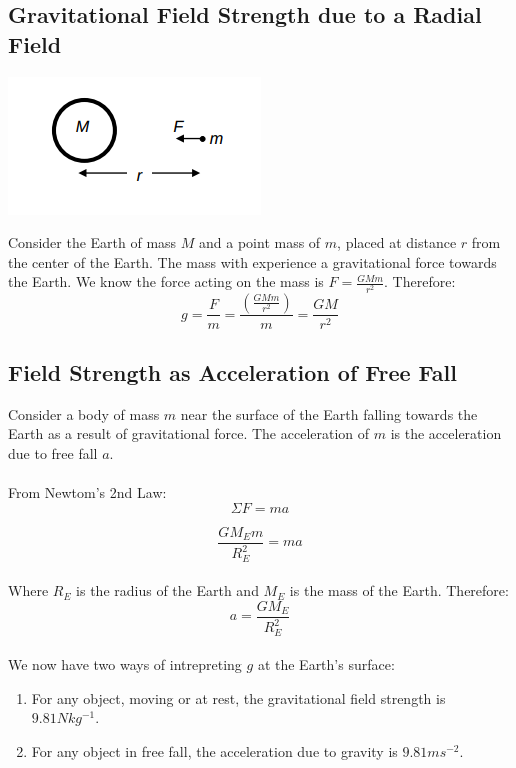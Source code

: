 \documentclass{article}
\begin{document}
\subsection{Gravitational Field Strength due to a Radial Field}
\begin{center}
    \includegraphics[scale=0.6]{assets/radialFieldGrav.png}
\end{center}\leavevmode Consider the Earth of mass $M$ and a point mass of $m$, placed at distance $r$ from the center of the Earth. The mass with experience a gravitational force towards the Earth.
We know the force acting on the mass is $F=\frac{GMm}{r^2}$. Therefore:
\\\begin{equation}
    g=\frac{F}{m}=\frac{(\frac{GMm}{r^2})}{m}=\frac{GM}{r^2}
\end{equation}

\subsection{Field Strength as Acceleration of Free Fall}
Consider a body of mass $m$ near the surface of the Earth falling towards the Earth as a result of gravitational force. The acceleration of $m$ is the acceleration due to free fall $a$.
\\
\\From Newtom's 2nd Law:
\begin{equation}
    \Sigma F=ma
\end{equation}

\begin{equation}
    \frac{GM_Em}{R_{E}^2}=ma
\end{equation}
\\Where $R_E$ is the radius of the Earth and $M_E$ is the mass of the Earth.
Therefore:
\begin{equation}
    a=\frac{GM_E}{R_E^2}
\end{equation}
\\We now have two ways of intrepreting $g$ at the Earth's surface:
\begin{enumerate}
    \item For any object, moving or at rest, the gravitational field strength is $9.81Nkg^{-1}$.
    \item For any object in free fall, the acceleration due to gravity is $9.81ms^{-2}$.
\end{enumerate}
\end{document}
